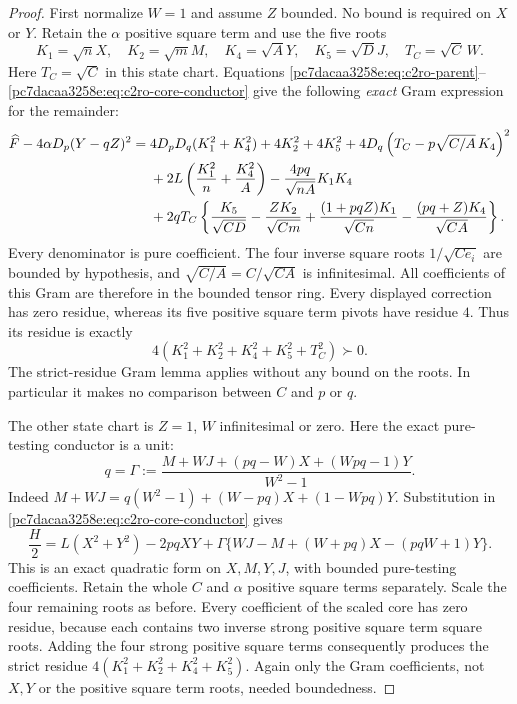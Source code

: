 \begin{proof}
First normalize $W=1$ and assume $Z$ bounded.  No bound is required
on $X$ or $Y$.  Retain the $\alpha$ positive square term and use the five roots
\[
 K_1=\sqrt nX,\quad K_2=\sqrt mM,\quad
 K_4=\sqrt AY,\quad K_5=\sqrt DJ,\quad T_C=\sqrt C\,W.
\]
Here $T_C=\sqrt C$ in this state chart.  Equations
\eqref{pc7dacaa3258e:eq:c2ro-parent}--\eqref{pc7dacaa3258e:eq:c2ro-core-conductor} give the following
\emph{exact} Gram expression for the remainder:
\begin{align}
\widehat F-4\alpha D_p(Y-qZ)^2={}&
 4D_pD_q(K_1^2+K_4^2)+4K_2^2+4K_5^2
 +4D_q\left(T_C-p\sqrt{C/A}\,K_4\right)^2\notag\\
&+2L\left(\frac{K_1^2}{n}+\frac{K_4^2}{A}\right)
 -\frac{4pq}{\sqrt{nA}}K_1K_4\notag\\
&+2qT_C\left\{
 \frac{K_5}{\sqrt{CD}}-\frac{ZK_2}{\sqrt{Cm}}
 +\frac{(1+pqZ)K_1}{\sqrt{Cn}}
 -\frac{(pq+Z)K_4}{\sqrt{CA}}\right\}.
\label{pc7dacaa3258e:eq:c2ro-Wunit-Gram}
\end{align}
Every denominator is pure coefficient.  The four inverse square roots
$1/\sqrt{Ce_i}$ are bounded by hypothesis, and
$\sqrt{C/A}=C/\sqrt{CA}$ is infinitesimal.
All coefficients of this Gram are therefore in the bounded tensor
ring.  Every displayed correction has zero residue, whereas its five
positive square term pivots have residue $4$.  Thus its residue is exactly
\[
             4(K_1^2+K_2^2+K_4^2+K_5^2+T_C^2)\succ0.
\]
The strict-residue Gram lemma applies without any bound on the roots.
In particular it makes no comparison between $C$ and $p$ or $q$.

The other state chart is $Z=1$, $W$ infinitesimal or zero.  Here the
exact pure-testing conductor is a unit:
\begin{equation}
 q=\Gamma:=\frac{M+WJ+(pq-W)X+(Wpq-1)Y}{W^2-1}.
\label{pc7dacaa3258e:eq:c2ro-Zunit-conductor}
\end{equation}
Indeed $M+WJ=q(W^2-1)+(W-pq)X+(1-Wpq)Y$.
Substitution in \eqref{pc7dacaa3258e:eq:c2ro-core-conductor} gives
\begin{equation}
 \frac H2=L(X^2+Y^2)-2pqXY
 +\Gamma\{WJ-M+(W+pq)X-(pqW+1)Y\}.
\label{pc7dacaa3258e:eq:c2ro-Zunit-core}
\end{equation}
This is an exact quadratic form on $X,M,Y,J$, with bounded pure-testing
coefficients.  Retain the whole $C$ and $\alpha$ positive square terms separately.
Scale the four remaining roots as before.  Every coefficient of the
scaled core has zero residue, because each contains two inverse strong
positive square term square roots.  Adding the four strong positive square terms consequently
produces the strict residue
$4(K_1^2+K_2^2+K_4^2+K_5^2)$.  Again only the Gram coefficients,
not $X,Y$ or the positive square term roots, needed boundedness.


\end{proof}
